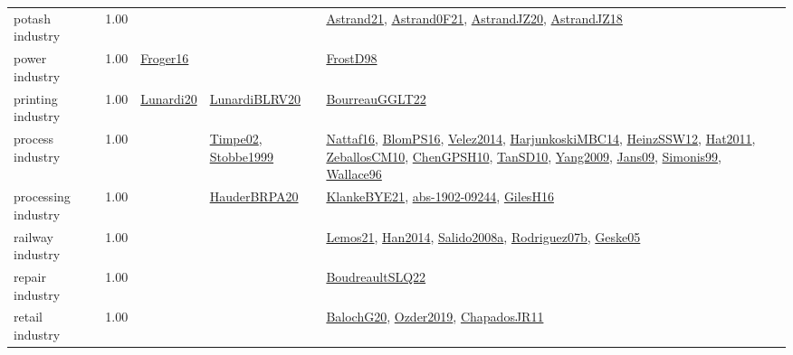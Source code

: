 {\begin{longtable}{p{3cm}r>{\raggedright\arraybackslash}p{6cm}>{\raggedright\arraybackslash}p{6cm}>{\raggedright\arraybackslash}p{8cm}}
\index{potash industry}\index{Industries!potash industry}potash industry &  1.00 &  &  & \hyperref[detail:Astrand21]{Astrand21}, \hyperref[detail:Astrand0F21]{Astrand0F21}, \hyperref[detail:AstrandJZ20]{AstrandJZ20}, \hyperref[detail:AstrandJZ18]{AstrandJZ18}\\
\index{power industry}\index{Industries!power industry}power industry &  1.00 & \hyperref[detail:Froger16]{Froger16} &  & \hyperref[detail:FrostD98]{FrostD98}\\
\index{printing industry}\index{Industries!printing industry}printing industry &  1.00 & \hyperref[detail:Lunardi20]{Lunardi20} & \hyperref[detail:LunardiBLRV20]{LunardiBLRV20} & \hyperref[detail:BourreauGGLT22]{BourreauGGLT22}\\
\index{process industry}\index{Industries!process industry}process industry &  1.00 &  & \hyperref[detail:Timpe02]{Timpe02}, \hyperref[detail:Stobbe1999]{Stobbe1999} & \hyperref[detail:Nattaf16]{Nattaf16}, \hyperref[detail:BlomPS16]{BlomPS16}, \hyperref[detail:Velez2014]{Velez2014}, \hyperref[detail:HarjunkoskiMBC14]{HarjunkoskiMBC14}, \hyperref[detail:HeinzSSW12]{HeinzSSW12}, \hyperref[detail:Hat2011]{Hat2011}, \hyperref[detail:ZeballosCM10]{ZeballosCM10}, \hyperref[detail:ChenGPSH10]{ChenGPSH10}, \hyperref[detail:TanSD10]{TanSD10}, \hyperref[detail:Yang2009]{Yang2009}, \hyperref[detail:Jans09]{Jans09}, \hyperref[detail:Simonis99]{Simonis99}, \hyperref[detail:Wallace96]{Wallace96}\\
\index{processing industry}\index{Industries!processing industry}processing industry &  1.00 &  & \hyperref[detail:HauderBRPA20]{HauderBRPA20} & \hyperref[detail:KlankeBYE21]{KlankeBYE21}, \hyperref[detail:abs-1902-09244]{abs-1902-09244}, \hyperref[detail:GilesH16]{GilesH16}\\
\index{railway industry}\index{Industries!railway industry}railway industry &  1.00 &  &  & \hyperref[detail:Lemos21]{Lemos21}, \hyperref[detail:Han2014]{Han2014}, \hyperref[detail:Salido2008a]{Salido2008a}, \hyperref[detail:Rodriguez07b]{Rodriguez07b}, \hyperref[detail:Geske05]{Geske05}\\
\index{repair industry}\index{Industries!repair industry}repair industry &  1.00 &  &  & \hyperref[detail:BoudreaultSLQ22]{BoudreaultSLQ22}\\
\index{retail industry}\index{Industries!retail industry}retail industry &  1.00 &  &  & \hyperref[detail:BalochG20]{BalochG20}, \hyperref[detail:Ozder2019]{Ozder2019}, \hyperref[detail:ChapadosJR11]{ChapadosJR11}\\

\end{longtable}}

